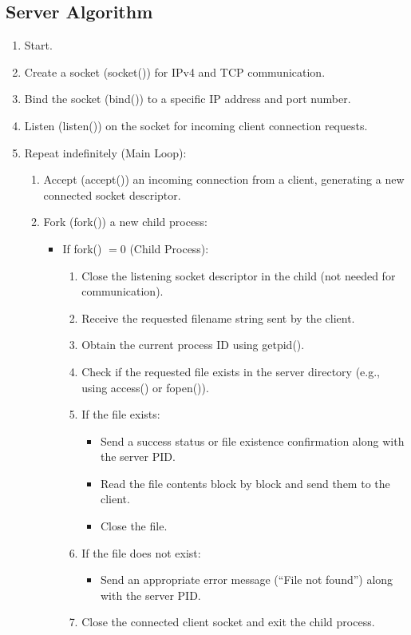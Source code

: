 \documentclass[12pt, a4paper]{report}
\begin{document}
\subsection*{Server Algorithm}
\begin{enumerate}
	\item Start.
	\item Create a socket (socket()) for IPv4 and TCP communication.
	\item Bind the socket (bind()) to a specific IP address and port number.
	\item Listen (listen()) on the socket for incoming client connection requests.
	\item Repeat indefinitely (Main Loop):
	\begin{enumerate}
		\item Accept (accept()) an incoming connection from a client, generating a new connected socket descriptor.
		\item Fork (fork()) a new child process:
		\begin{itemize}
			\item If fork() $= 0$ (Child Process):
			\begin{enumerate}
				\item Close the listening socket descriptor in the child (not needed for communication).
				\item Receive the requested filename string sent by the client.
				\item Obtain the current process ID using getpid().
				\item Check if the requested file exists in the server directory (e.g., using access() or fopen()).
				\item If the file exists:
				\begin{itemize}
					\item Send a success status or file existence confirmation along with the server PID.
					\item Read the file contents block by block and send them to the client.
					\item Close the file.
				\end{itemize}
				\item If the file does not exist:
				\begin{itemize}
					\item Send an appropriate error message (``File not found'') along with the server PID.
				\end{itemize}
				\item Close the connected client socket and exit the child process.

\end{enumerate}
\end{itemize}
\end{enumerate}
\end{enumerate}
\end{document}
